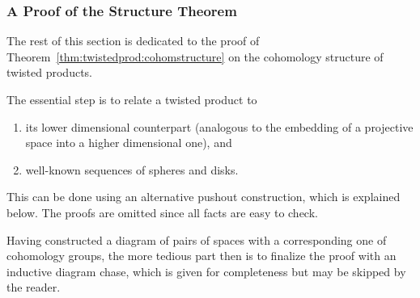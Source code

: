 \subsubsection{A Proof of the Structure Theorem}
The rest of this section is dedicated to the proof of
Theorem~\ref{thm:twistedprod:cohomstructure} on the cohomology
structure of twisted products.

The essential step is to relate a twisted product to
\begin{enumerate}[1.]
\item its lower dimensional counterpart (analogous to the embedding of
  a projective space into a higher dimensional one), and
\item well-known sequences of spheres and disks.
\end{enumerate}
This can be done using an alternative pushout construction, which is
explained below. The proofs are omitted since all facts are easy to
check.

Having constructed a diagram of pairs of spaces with a corresponding
one of cohomology groups, the more tedious part then is to finalize
the proof with an inductive diagram chase, which is given for
completeness but may be skipped by the reader.


